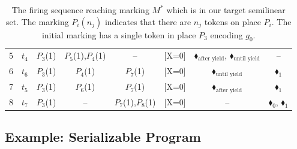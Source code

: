 \begin{table}[!htbp]
\begin{tabular}{c l c c c c c c}
		5 & $t_4$                                  
		& {\color{blue}$P_3$(1)}                  
		& $P_5$(1),$P_4$(1)                          
		& --                                    
		&                                   {\color{blue}[X=0]}     
		&                                    {\color{black}$\blacklozenge_\text{after yield}$}, {\color{black}$\blacklozenge_\text{until yield}$}   
		& --                                    \\
		6 & $t_6$                     
		& {\color{blue}$P_3$(1)}                  
		& $P_4$(1)                                
		& {\color{red}$P_7$(1)}                    
		&                                      	{\color{blue}[X=0]}  
		&                                    {\color{black}$\blacklozenge_\text{until yield}$}   
		&                                   {\color{red}$\blacklozenge_1$}     \\
		7 & $t_5$                                  
		& {\color{blue}$P_3$(1)}                  
		& $P_6$(1)                                
		& {\color{red}$P_7$(1)}                    
		&                                   {\color{blue}[X=0]}    
		&                                    {\color{black}$\blacklozenge_\text{after yield}$}      
		&                                   {\color{red}$\blacklozenge_1$}        \\
		8 & $t_7$                     
		& {\color{blue}$P_3$(1)}                                  
		& --                                    
		& {\color{red}$P_7$(1),\color{red}$P_8$(1)}    
		&                                   {\color{blue}[X=0]}    
		&                                   --    
		&                                   {\color{red}$\blacklozenge_0$}, {\color{red}$\blacklozenge_1$}       \\
		\bottomrule
	\end{tabular}
	\caption{The firing sequence reaching marking $M^*$ which is in our target semilinear set. The marking $P_i(n_j)$ indicates that there are $n_j$ tokens on place $P_i$. The initial marking has a single token in place $P_3$ encoding $g_0$.}
	\label{tab:PetriNetFiringCounterexample}
\end{table}


\subsection{Example: Serializable Program}
\label{subsec:ns-serializable}

